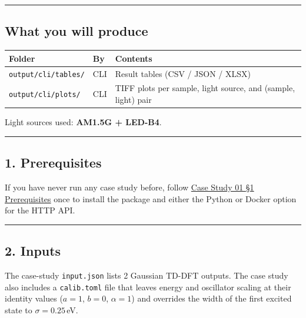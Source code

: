 \documentclass[
  11pt,
]{article}
\begin{document}
\begin{center}\rule{0.5\linewidth}{0.5pt}\end{center}

\hypertarget{what-you-will-produce}{
\subsection{What you will produce}\label{what-you-will-produce}}

\begin{longtable}[]{@{}lll@{}}
\toprule
Folder & By & Contents \\
\midrule
\endhead
\texttt{output/cli/tables/} & CLI & Result tables (CSV / JSON / XLSX) \\
\texttt{output/cli/plots/} & CLI & TIFF plots per sample, light source,
and (sample, light) pair \\
\bottomrule
\end{longtable}

Light sources used: \textbf{AM1.5G + LED-B4}.

\begin{center}\rule{0.5\linewidth}{0.5pt}\end{center}

\hypertarget{1-prerequisites}{
\subsection{1. Prerequisites}\label{1-prerequisites}}

If you have never run any case study before, follow
\href{https://github.com/pinarsyt/overlap-calculator/blob/main/case_studies/01_theoretical_only/README.md\#1-prerequisites}{Case
Study 01 \S1 Prerequisites} once to install the package and either the
Python or Docker option for the HTTP API.

\begin{center}\rule{0.5\linewidth}{0.5pt}\end{center}

\hypertarget{2-inputs}{
\subsection{2. Inputs}\label{2-inputs}}

The case-study \texttt{input.json} lists 2 Gaussian TD-DFT outputs. The
case study also includes a \texttt{calib.toml} file that leaves energy
and oscillator scaling at their identity values (\(a=1\), \(b=0\),
\(\alpha=1\)) and overrides the width of the first excited state to
\(\sigma = 0.25\)\,eV.
\end{document}

